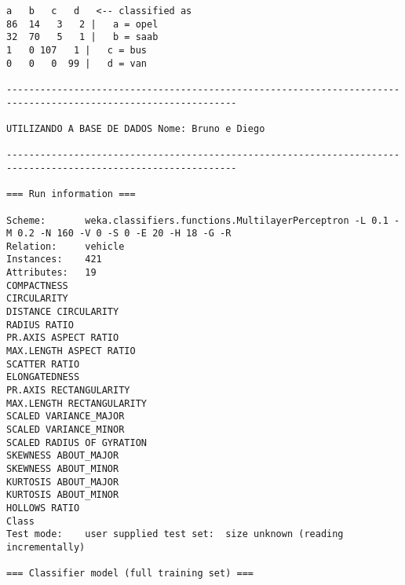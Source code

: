 \documentclass[
	article,			%
	11pt,				%
	oneside,			%
	a4paper,			%
	english,			%
	brazil,				%
	sumario=tradicional
	]{abntex2}
\begin{document}
\begin{lstlisting}
a   b   c   d   <-- classified as
86  14   3   2 |   a = opel
32  70   5   1 |   b = saab
1   0 107   1 |   c = bus
0   0   0  99 |   d = van

---------------------------------------------------------------------------------------------------------------

UTILIZANDO A BASE DE DADOS Nome: Bruno e Diego

---------------------------------------------------------------------------------------------------------------

=== Run information ===

Scheme:       weka.classifiers.functions.MultilayerPerceptron -L 0.1 -M 0.2 -N 160 -V 0 -S 0 -E 20 -H 18 -G -R
Relation:     vehicle
Instances:    421
Attributes:   19
COMPACTNESS
CIRCULARITY
DISTANCE CIRCULARITY
RADIUS RATIO
PR.AXIS ASPECT RATIO
MAX.LENGTH ASPECT RATIO
SCATTER RATIO
ELONGATEDNESS
PR.AXIS RECTANGULARITY
MAX.LENGTH RECTANGULARITY
SCALED VARIANCE_MAJOR
SCALED VARIANCE_MINOR
SCALED RADIUS OF GYRATION
SKEWNESS ABOUT_MAJOR
SKEWNESS ABOUT_MINOR
KURTOSIS ABOUT_MAJOR
KURTOSIS ABOUT_MINOR
HOLLOWS RATIO
Class
Test mode:    user supplied test set:  size unknown (reading incrementally)

=== Classifier model (full training set) ===


\end{lstlisting}
\end{document}
